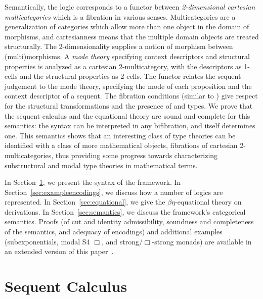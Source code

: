 \documentclass[a4paper,USenglish,numberwithinsect]{lipics-v2016}
\newcommand\deq{\ensuremath{\equiv}}
\newcommand\spr{\ensuremath{\Rightarrow}} %
\begin{document}
Semantically, the logic corresponds to a functor between
\emph{2-dimensional cartesian multicategories} which is a fibration in
various senses.  Multicategories are a generalization of categories
which allow more than one object in the domain of morphisms, and
cartesianness means that the multiple domain objects are treated
structurally.  The 2-dimensionality supplies a notion of morphism
between (multi)morphisms.  A \emph{mode theory} specifying context
descriptors and structural properties is analyzed as a cartesian
2-multicategory, with the descriptors as 1-cells and the structural
properties as 2-cells.  The functor relates the sequent judgement to the
mode theory, specifying the mode of each proposition and the context
descriptor of a sequent.  The fibration conditions (similar to
\cite{hermida02fibrations,hormann15multicategories}) give respect for
the structural transformations and the presence of  and 
types.  We prove that the sequent calculus and the equational theory are
sound and complete for this semantics: the syntax can be interpreted in
any bifibration, and itself determines one.  This semantics shows that
an interesting class of type theories can be identified with a class of
more mathematical objects, fibrations of cartesian 2-multicategories,
thus providing some progress towards characterizing substructural and
modal type theories in mathematical terms.

In Section~\ref{sec:syntax}, we present the syntax of the framework.  In
Section~\ref{sec:exampleencodings}, we discuss how a number of logics
are represented.  In Section~\ref{sec:equational}, we give the
$\beta\eta$-equational theory on derivations.  In
Section~\ref{sec:semantics}, we discuss the framework's categorical
semantics.  Proofs (of cut and identity admissibility, soundness and
completeness of the semantics, and adequacy of encodings) and additional
examples (subexponentials, modal S4 $\Box$, and strong/$\Box$-strong
monads) are available in an extended version of this paper~\cite{lsr17multi-extended}.


\newcommand\wfsp[4]{\ensuremath{#1 \vdash #2 \spr_{#4} #3}}

\section{Sequent Calculus}
\label{sec:syntax}

\newcommand\wfsig[1]{\ensuremath{#1 \, \dsd{sig}}}
\newcommand\deqtms[5]{\ensuremath{#1 \vdash_{#2} #3 \deq #4 : #5}}
\newcommand\wfsps[5]{\ensuremath{#1 \vdash_{#2} #3 \spr_{#5} #4}}
\end{document}
